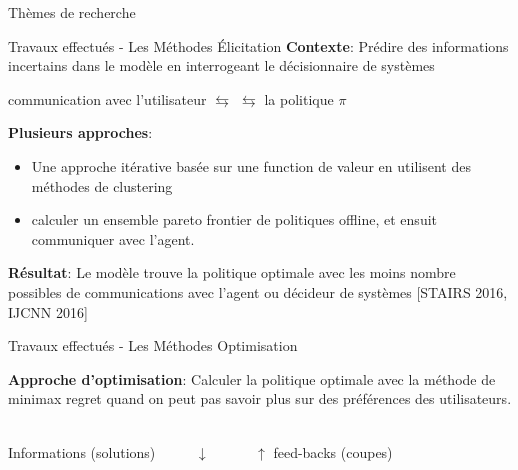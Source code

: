 \documentclass{beamer}
\begin{document}
{{\begin{frame}{Thèmes de recherche}
\end{frame}
\begin{frame}{Travaux effectués - Les Méthodes Élicitation}
\textbf{Contexte}: Prédire des informations incertains dans le modèle en interrogeant le décisionnaire de systèmes
\vspace{0.2cm}

\begin{center}
communication avec l’utilisateur $\leftrightarrows$  $\leftrightarrows$ la politique $\pi$
\end{center}
\vspace{0.2cm}

\textbf{Plusieurs approches}:
\begin{itemize}
\item Une approche itérative basée sur une function de valeur en utilisent des méthodes de clustering
\item calculer un ensemble pareto frontier de politiques offline, et ensuit communiquer avec l’agent.
\end{itemize}

\textbf{Résultat}: Le modèle trouve la politique optimale avec les moins
nombre possibles de communications avec l’agent ou décideur de
systèmes [STAIRS 2016, IJCNN 2016]

\end{frame}

\begin{frame}{Travaux effectués - Les Méthodes Optimisation}


\textbf{Approche d’optimisation}: Calculer la politique optimale avec la méthode de minimax regret quand on peut pas savoir plus sur des préférences des utilisateurs.

\vspace{0.2cm}

\begin{center}
	 \\
	\vspace{0.1cm}
	Informations (solutions)~~~~~ $\downarrow$ ~~~~~ $\uparrow$ feed-backs (coupes)\\
	\vspace{0.1cm}


\end{center}
\end{frame}}}
\end{document}
